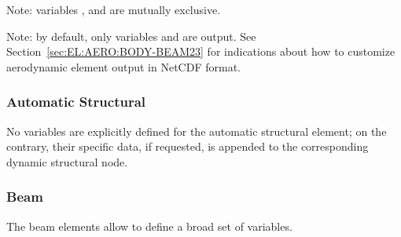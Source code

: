 Note: variables ,
and  are mutually exclusive.

Note: by default, only variables 
and  are output.
See Section~\ref{sec:EL:AERO:BODY-BEAM23} for indications
about how to customize aerodynamic element output in NetCDF format.


\subsubsection{Automatic Structural}
\label{sec:NetCDF:Elem:Automatic Structural}
No variables are explicitly defined for the automatic structural
element; on the contrary, their specific data, if requested,
is appended to the corresponding dynamic structural node.


\subsubsection{Beam}
\label{sec:NetCDF:Elem:Beam}

The beam elements allow to define a broad set of variables.

